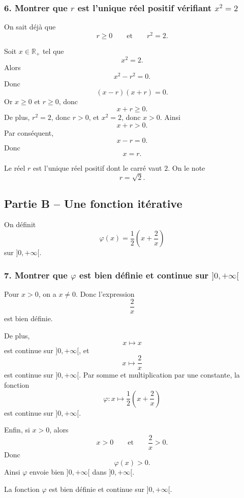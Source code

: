 \documentclass[11pt,a4paper]{article}
\newcommand{\R}{\mathbb{R}}
\begin{document}

\subsubsection*{6. Montrer que \(r\) est l'unique réel positif vérifiant \(x^2=2\)}

On sait déjà que
\[
r\geq 0
\qquad\text{et}\qquad
r^2=2.
\]

Soit \(x\in\R_+\) tel que
\[
x^2=2.
\]
Alors
\[
x^2-r^2=0.
\]
Donc
\[
(x-r)(x+r)=0.
\]
Or \(x\geq 0\) et \(r\geq 0\), donc
\[
x+r\geq 0.
\]
De plus, \(r^2=2\), donc \(r>0\), et \(x^2=2\), donc \(x>0\). Ainsi
\[
x+r>0.
\]
Par conséquent,
\[
x-r=0.
\]
Donc
\[
x=r.
\]

\begin{resultatbox}
Le réel \(r\) est l'unique réel positif dont le carré vaut \(2\). On le note
\[
r=\sqrt2.
\]
\end{resultatbox}


\subsection*{Partie B -- Une fonction itérative}

On définit
\[
\varphi(x)=\frac12\left(x+\frac2x\right)
\]
sur \(]0,+\infty[\).


\subsubsection*{7. Montrer que \(\varphi\) est bien définie et continue sur \(]0,+\infty[\)}

Pour \(x>0\), on a \(x\neq 0\). Donc l'expression
\[
\frac2x
\]
est bien définie.

De plus,
\[
x\mapsto x
\]
est continue sur \(]0,+\infty[\), et
\[
x\mapsto \frac2x
\]
est continue sur \(]0,+\infty[\). Par somme et multiplication par une constante, la fonction
\[
\varphi:x\mapsto \frac12\left(x+\frac2x\right)
\]
est continue sur \(]0,+\infty[\).

Enfin, si \(x>0\), alors
\[
x>0
\qquad\text{et}\qquad
\frac2x>0.
\]
Donc
\[
\varphi(x)>0.
\]
Ainsi \(\varphi\) envoie bien \(]0,+\infty[\) dans \(]0,+\infty[\).

\begin{resultatbox}
La fonction \(\varphi\) est bien définie et continue sur \(]0,+\infty[\).
\end{resultatbox}
\end{document}

